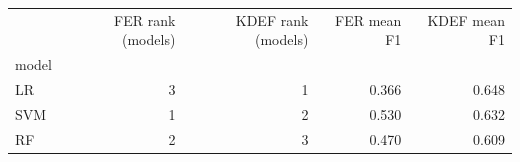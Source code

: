 \begin{tabular}{lrrrr}
\toprule
 & FER rank (models) & KDEF rank (models) & FER mean F1 & KDEF mean F1 \\
model &  &  &  &  \\
\midrule
LR & 3 & 1 & 0.366 & 0.648 \\
SVM & 1 & 2 & 0.530 & 0.632 \\
RF & 2 & 3 & 0.470 & 0.609 \\
\bottomrule
\end{tabular}
